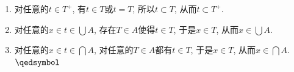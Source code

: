 \documentclass[UTF8]{ctexart}
\begin{document}

\begin{enumerate}
    \item 对任意的$t\in T^+$, 有$t\in T$或$t=T$,
    所以$t\subset T$, 从而$t\subset T^+$.
    \vspace{3pt}
    \item 对任意的$x\in t\in\displaystyle\bigcup A$, 存在$T\in A$使得$t\in T$,
    于是$x\in T$, 从而$\displaystyle x\in\bigcup A$.
    \vspace{3pt}
    \item 对任意的$x\in t\in\displaystyle\bigcap A$, 对任意的$T\in A$都有$t\in T$,
    于是$x\in T$, 从而$\displaystyle x\in\bigcap A$. \hfill $\qedsymbol$
\end{enumerate}
\end{document}
